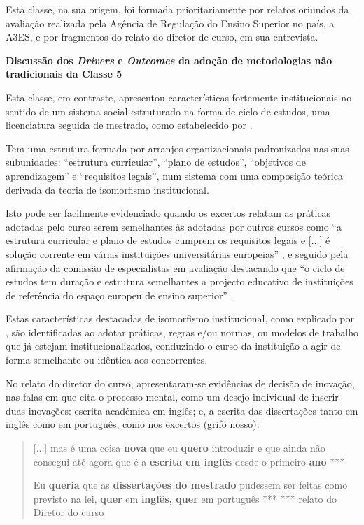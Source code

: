 \documentclass{textolivre-html}
\begin{document}
Esta classe, na sua origem, foi formada prioritariamente por relatos oriundos da avaliação realizada pela Agência de Regulação do Ensino Superior no país, a A3ES, e por fragmentos do relato do diretor de curso, em sua entrevista.

\textbf{Discussão dos \textit{Drivers} e \textit{Outcomes} da adoção de metodologias não tradicionais da Classe 5}

Esta classe, em contraste, apresentou características fortemente institucionais no sentido de um sistema social estruturado na forma de ciclo de estudos, uma licenciatura seguida de mestrado, como estabelecido por \textcite{rogers1983}.

Tem uma estrutura formada por arranjos organizacionais padronizados nas suas subunidades: “estrutura curricular”, “plano de estudos”, “objetivos de aprendizagem” e “requisitos legais”, num sistema com uma composição teórica derivada da teoria de isomorfismo institucional.

Isto pode ser facilmente evidenciado quando os excertos relatam as práticas adotadas pelo curso serem semelhantes às adotadas por outros cursos como “a estrutura curricular e plano de estudos cumprem os requisitos legais e [...] é solução corrente em várias instituições universitárias europeias” \cite{A3ES2015a}, e seguido pela afirmação da comissão de especialistas em avaliação destacando que “o ciclo de estudos tem duração e estrutura semelhantes a projecto educativo de instituições de referência do espaço europeu de ensino superior” \cite{A3ES2015b}.   

Estas características destacadas de isomorfismo institucional, como explicado por \textcite{dimaggio1983}, são identificadas ao adotar práticas, regras e/ou normas, ou modelos de trabalho que já estejam institucionalizados, conduzindo o curso da instituição a agir de forma semelhante ou idêntica aos concorrentes.

No relato do diretor do curso, apresentaram-se evidências de decisão de inovação, nas falas em que cita o processo mental, como um desejo individual de inserir duas inovações:  escrita académica em inglês; e, a escrita das dissertações tanto em inglês como em português, como nos excertos (grifo nosso):

\begin{quote}
[...] mas é uma coisa \textbf{nova} que eu \textbf{quero} introduzir e que ainda não consegui até agora que é a \textbf{escrita em inglês} desde o primeiro \textbf{ano} ***

Eu \textbf{queria} que as \textbf{dissertações do mestrado} pudessem ser feitas como previsto na lei, \textbf{quer} em \textbf{inglês, quer} em português ***
*** relato do Diretor do curso
\end{quote}
\end{document}
